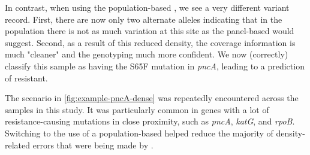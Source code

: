 In contrast, when using the population-based \prg{}, we see a very different variant record. First, there are now only two alternate alleles indicating that in the population there is not as much variation at this site as the panel-based \prg{} would suggest. Second, as a result of this reduced density, the coverage information is much "cleaner" and the genotyping much more confident. We now (correctly) classify this sample as having the S65F mutation in \textit{pncA}, leading to a prediction of resistant.

The scenario in \autoref{fig:example-pncA-dense} was repeatedly encountered across the samples in this study. It was particularly common in genes with a lot of resistance-causing mutations in close proximity, such as \textit{pncA}, \textit{katG}, and \textit{rpoB}. Switching to the use of a population-based \prg{} helped reduce the majority of density-related errors that were being made by \drprg{}.

